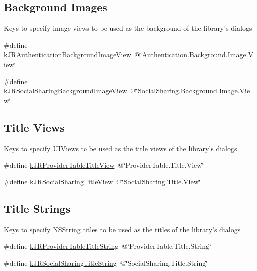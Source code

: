 \subsection*{Background Images}
\label{_amgrp2c0408c2c62eea12966fb29a94739702}
 Keys to specify image views to be used as the background of the library's dialogs \begin{DoxyCompactItemize}
\item 
\#define \hyperlink{group__custom_interface_ga68a4950b1b3834ce60218856f596059f}{kJRAuthenticationBackgroundImageView}~@\char`\"{}Authentication.Background.Image.View\char`\"{}
\item 
\#define \hyperlink{group__custom_interface_gafe08832d1e15427e1bc1c8c1e3a4c641}{kJRSocialSharingBackgroundImageView}~@\char`\"{}SocialSharing.Background.Image.View\char`\"{}
\end{DoxyCompactItemize}
\subsection*{Title Views}
\label{_amgrp3aa85b42b54fc9202c3d403d77360bef}
 \label{group__custom_interface_titleViews}
\hypertarget{group__custom_interface_titleViews}{}


Keys to specify UIViews to be used as the title views of the library's dialogs \begin{DoxyCompactItemize}
\item 
\#define \hyperlink{group__custom_interface_ga0bce97edf43c9cdf53cbcd1aa92c4798}{kJRProviderTableTitleView}~@\char`\"{}ProviderTable.Title.View\char`\"{}
\item 
\#define \hyperlink{group__custom_interface_ga524965cf426f0eb9de4bcb804528c7f7}{kJRSocialSharingTitleView}~@\char`\"{}SocialSharing.Title.View\char`\"{}
\end{DoxyCompactItemize}
\subsection*{Title Strings}
\label{_amgrp57383e7526d006c80c9394d9945c0a3b}
 \label{group__custom_interface_titleStrings}
\hypertarget{group__custom_interface_titleStrings}{}


Keys to specify NSString titles to be used as the titles of the library's dialogs \begin{DoxyCompactItemize}
\item 
\#define \hyperlink{group__custom_interface_gaf728e45125be9ca6fa515a39a77e7ce7}{kJRProviderTableTitleString}~@\char`\"{}ProviderTable.Title.String\char`\"{}
\item 
\#define \hyperlink{group__custom_interface_ga8fb89469dc5225bf0ea4d1faca6aa2ab}{kJRSocialSharingTitleString}~@\char`\"{}SocialSharing.Title.String\char`\"{}
\end{DoxyCompactItemize}
